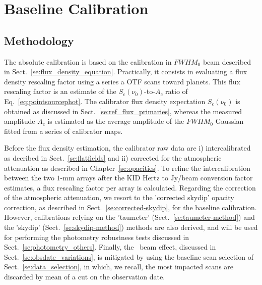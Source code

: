 \section{Baseline Calibration}%
\label{se:baseline_calibration}

\subsection{Methodology}
\label{se:baseline_calibration_method}

The absolute calibration is based on the calibration in $FWHM_0$ beam
described in Sect.~\ref{se:flux_density_equation}. 
Practically, it consists in evaluating a flux
density rescaling factor using a series a OTF scans toward
planets. This flux rescaling factor is an estimate of the
$S_{c}(\nu_{0})$-to-$A_{c}$ ratio of Eq.~\ref{eq:pointsourcephot}. The
calibrator flux density expectation $S_{c}(\nu_{0})$ is obtained as
discussed in Sect.~\ref{se:ref_flux_primaries}, whereas the measured
amplitude $A_c$ is estimated as the average amplitude of the $FWHM_0$
Gaussian fitted from a series of calibrator maps.

Before the flux density estimation, the calibrator raw data are i)
intercalibrated as decribed in Sect.~\ref{se:flatfields} and ii) corrected for the
atmospheric attenuation as described in Chapter~\ref{se:opacities}. To
refine the intercalibration between the two $1$-mm arrays after the
KID Hertz to Jy/beam conversion factor estimates, a flux rescaling
factor per array is calculated. Regarding the correction of the
atmospheric attenuation, we
resort to the 'corrected skydip' opacity correction, as described in
Sect.~\ref{se:corrected-skydip}, for the baseline calibration.
However, calibrations relying on the
'taumeter' (Sect.~\ref{se:taumeter-method}) and the 'skydip'
(Sect.~\ref{se:skydip-method}) methods are also derived, and will be
used for performing the photometry robustness tests discussed in
Sect.~\ref{se:photometry_others}. Finally, the \afternoon\ beam
effect, discussed in Sect.~\ref{se:obsdate_variations}, is mitigated by
using the baseline scan selection of
Sect.~\ref{se:data_selection}, in which, we recall, the most
impacted scans are discarded by mean of a cut on the observation
date. 

